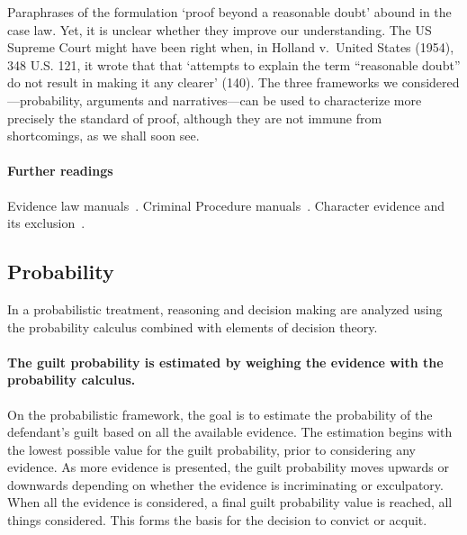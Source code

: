 \documentclass[10pt]{article}
\begin{document}
Paraphrases of the formulation `proof beyond a reasonable doubt' 
abound in the case law. Yet, it is unclear 
whether they improve our understanding. The US Supreme Court might have been right when, in Holland v.\ United States (1954), 348 U.S. 121, 
it wrote that that `attempts to explain the term ``reasonable doubt'' do not result in making it any clearer' (140).
The three frameworks we considered---probability, arguments and narratives---can be used to characterize 
more precisely the standard of proof, although they are not immune from shortcomings, 
as we shall soon see.


\paragraph{Further readings}
Evidence law manuals~\citep{fisher2008, mendez2008}. 
Criminal Procedure manuals~\citep{allenEtAl2011}.
Character evidence and its exclusion~\citep{redmayne2015}.
 

 
 




\subsection{Probability}

In a probabilistic treatment, reasoning and decision making are analyzed using the probability calculus combined with elements of decision theory.
\paragraph{The guilt probability is estimated by weighing the evidence with the probability calculus.}

 On the probabilistic framework, the goal is to estimate the probability of the defendant's guilt based 
 on all the available evidence. The estimation begins with the lowest possible value 
for the guilt probability, prior to considering any evidence. As more evidence is presented, the guilt probability 
moves upwards or downwards depending on whether the evidence is incriminating or exculpatory. 
When all the evidence is considered, a final guilt probability value is 
reached, all things considered. This forms the basis for 
the decision to convict or acquit. 
\end{document}
